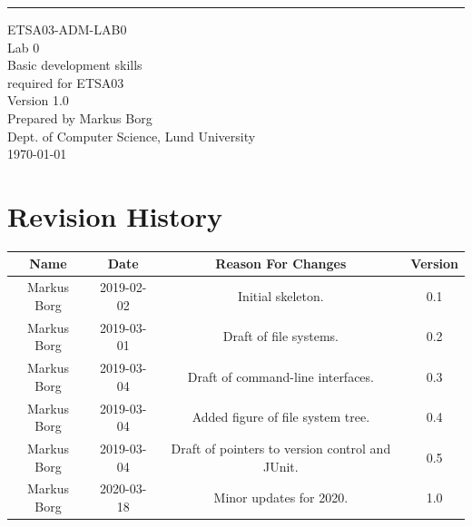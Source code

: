 \documentclass{scrreprt}
\date{}
\def\myversion{1.0 }
\begin{document}
\begin{flushright}
    \rule{16cm}{5pt}\vskip1cm
    \begin{bfseries}
    	\LARGE{ETSA03-ADM-LAB0}\\
    	\vspace{1.5cm}
        \Huge{Lab 0}\\
        \vspace{0.5cm}
        Basic development skills\\
        \vspace{0.5cm}
        required for ETSA03\\
        \vspace{1.5cm}
        \LARGE{Version \myversion}\\
        \vspace{1.5cm}
        Prepared by Markus Borg\\
        Dept. of Computer Science, Lund University\\
        \vspace{1.5cm}
        \today\\
    \end{bfseries}
\end{flushright}


\chapter*{Revision History}

\begin{center}
    \begin{tabular}{|c|c|c|c|}
        \hline
	    Name & Date & Reason For Changes & Version\\
        \hline
	    Markus Borg & 2019-02-02 & Initial skeleton. & 0.1\\
        \hline
        Markus Borg & 2019-03-01 & Draft of file systems. & 0.2\\
        \hline
        Markus Borg & 2019-03-04 & Draft of command-line interfaces. & 0.3\\
        \hline
        Markus Borg & 2019-03-04 & Added figure of file system tree. & 0.4\\
        \hline
        Markus Borg & 2019-03-04 & Draft of pointers to version control and JUnit. & 0.5\\
        \hline
        Markus Borg & 2020-03-18 & Minor updates for 2020. & 1.0\\
        \hline
    \end{tabular}
\end{center}
\end{document}
